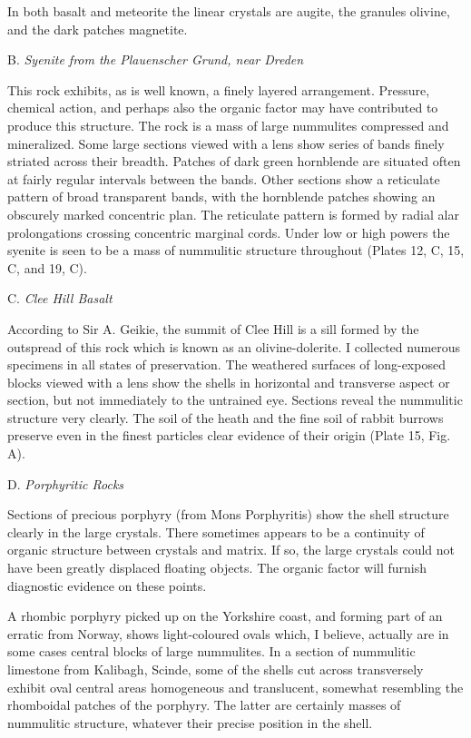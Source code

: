 \documentclass[a4paper, 12pt, oneside]{article}
\begin{document}
In both basalt and meteorite the linear crystals are augite, the granules olivine, and the dark patches magnetite.

\bigskip
\centerline{B. \emph{Syenite from the Plauenscher Grund, near Dreden}}

This rock exhibits, as is well known, a finely layered arrangement. Pressure, chemical action, and perhaps also the organic factor may have contributed to produce this structure. The rock is a mass of large nummulites compressed and mineralized. Some large sections viewed with a lens show series of bands finely striated across their breadth. Patches of dark green hornblende are situated often at fairly regular intervals between the bands. Other sections show a reticulate pattern of broad transparent bands, with the hornblende patches showing an obscurely marked concentric plan. The reticulate pattern is formed by radial alar prolongations crossing concentric marginal cords. Under low or high powers the syenite is seen to be a mass of nummulitic structure throughout (Plates 12, C, 15, C, and 19, C).

\bigskip
\centerline{C. \emph{Clee Hill Basalt}}

According to Sir A. Geikie, the summit of Clee Hill is a sill formed by the outspread of this rock which is known as an olivine-dolerite. I collected numerous specimens in all states of preservation. The weathered surfaces of long-exposed blocks viewed with a lens show the shells in horizontal and transverse aspect or section, but not immediately to the untrained eye. Sections reveal the nummulitic structure very clearly. The soil of the heath and the fine soil of rabbit burrows preserve even in the finest particles clear evidence of their origin (Plate 15, Fig. A).

\bigskip
\centerline{D. \emph{Porphyritic Rocks}}

Sections of precious porphyry (from Mons Porphyritis) show the shell structure clearly in the large crystals. There sometimes appears to be a continuity of organic structure between crystals and matrix. If so, the large crystals could not have been greatly displaced floating objects. The organic factor will furnish diagnostic evidence on these points.

A rhombic porphyry picked up on the Yorkshire coast, and forming part of an erratic from Norway, shows light-coloured ovals which, I believe, actually are in some cases central blocks of large nummulites. In a section of nummulitic limestone from Kalibagh, Scinde, some of the shells cut across transversely exhibit oval central areas homogeneous and translucent, somewhat resembling the rhomboidal patches of the porphyry. The latter are certainly masses of nummulitic structure, whatever their precise position in the shell.
\end{document}
